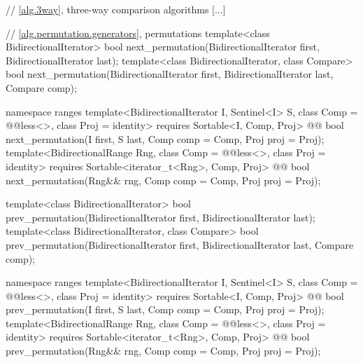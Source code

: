 \begin{codeblock}
  // \ref{alg.3way}, three-way comparison algorithms
  [...]

  // \ref{alg.permutation.generators}, permutations
  template<class BidirectionalIterator>
    bool next_permutation(BidirectionalIterator first,
                          BidirectionalIterator last);
  template<class BidirectionalIterator, class Compare>
    bool next_permutation(BidirectionalIterator first,
                          BidirectionalIterator last, Compare comp);
\end{codeblock}\begin{addedblock}\begin{codeblock}
  namespace ranges {
    template<BidirectionalIterator I, Sentinel<I> S, class Comp = @@less<>,
        class Proj = identity>
      requires Sortable<I, Comp, Proj>
      @@ bool
        next_permutation(I first, S last, Comp comp = Comp{}, Proj proj = Proj{});
    template<BidirectionalRange Rng, class Comp = @@less<>,
        class Proj = identity>
      requires Sortable<iterator_t<Rng>, Comp, Proj>
      @@ bool
        next_permutation(Rng&& rng, Comp comp = Comp{}, Proj proj = Proj{});
  }
\end{codeblock}\end{addedblock}\begin{codeblock}
  template<class BidirectionalIterator>
    bool prev_permutation(BidirectionalIterator first,
                          BidirectionalIterator last);
  template<class BidirectionalIterator, class Compare>
    bool prev_permutation(BidirectionalIterator first,
                          BidirectionalIterator last, Compare comp);
\end{codeblock}\begin{addedblock}\begin{codeblock}
  namespace ranges {
    template<BidirectionalIterator I, Sentinel<I> S, class Comp = @@less<>,
        class Proj = identity>
      requires Sortable<I, Comp, Proj>
      @@ bool
        prev_permutation(I first, S last, Comp comp = Comp{}, Proj proj = Proj{});
    template<BidirectionalRange Rng, class Comp = @@less<>,
        class Proj = identity>
      requires Sortable<iterator_t<Rng>, Comp, Proj>
      @@ bool
        prev_permutation(Rng&& rng, Comp comp = Comp{}, Proj proj = Proj{});
  }
\end{codeblock}\end{addedblock}\begin{codeblock}
}
\end{codeblock}

